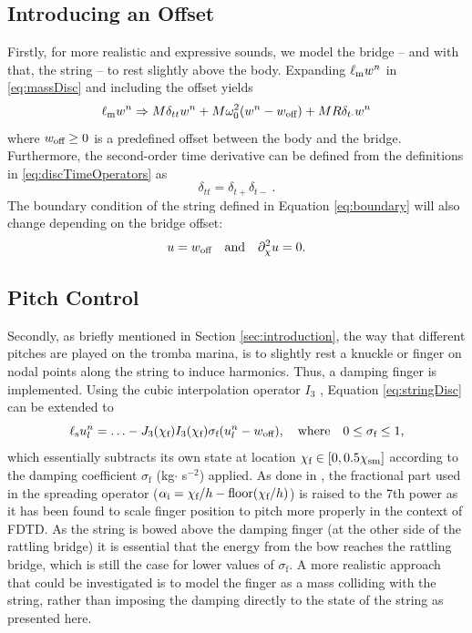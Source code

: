     \subsection{Introducing an Offset}
    Firstly, for more realistic and expressive sounds, we model the bridge -- and with that, the string -- to rest slightly above the body. Expanding $\ell_\text{m}w^n$ in \eqref{eq:massDisc} and including the offset yields
    \begin{equation}\label{eq:offset}
        \ell_\text{m}w^n \Rightarrow M\delta_{tt}w^n+M\omega_0^2(w^n-w_\text{off})+MR\delta_{t\cdot}w^n
    \end{equation}
    where $w_\text{off} \geq 0$ is a predefined offset between the body and the bridge. Furthermore, the second-order time derivative can be defined from the definitions in \eqref{eq:discTimeOperators} as
    \begin{equation}
        \delta_{tt} = \delta_{t+}\delta_{t-}\ .
    \end{equation}
    The boundary condition of the string defined in Equation \eqref{eq:boundary} will also change depending on the bridge offset:
    \begin{equation}\label{eq:newBoundary}
        u = w_\text{off}\quad \text{and} \quad \partial_\chi^2u=0.
    \end{equation}
    
    \subsection{Pitch Control}
    Secondly, as briefly mentioned in Section \ref{sec:introduction}, the way that different pitches are played on the tromba marina, is to slightly rest a knuckle or finger on nodal points along the string to induce harmonics. Thus, a damping finger is implemented. Using the cubic interpolation operator $I_3$ \cite{bilbao2009numerical}, Equation \eqref{eq:stringDisc} can be extended to
    \begin{equation}\label{eq:dampingFinger}
        \ell_\text{s} u_l^n = \hdots - J_3(\chi_\text{f})I_3(\chi_\text{f})\sigma_\text{f}(u^n_l-w_\text{off}),\quad \text{where} \quad 0\leq \sigma_\text{f} \leq 1,
    \end{equation}
    which essentially subtracts its own state at location $\chi_\text{f} \in [0,0.5\chi_\text{sm}]$ according to the damping coefficient $\sigma_\text{f}$ (kg$ \cdot$ s$^{-2}$) applied. As done in \cite{Willemsen2019a:SMC2020}, the fractional part used in the spreading operator ($\alpha_\text{i} = \chi_\text{f}/h - \text{floor}(\chi_\text{f}/h)$) is raised to the 7th power as it has been found to scale finger position to pitch more properly in the context of FDTD. As the string is bowed above the damping finger (at the other side of the rattling bridge) it is essential that the energy from the bow reaches the rattling bridge, which is still the case for lower values of $\sigma_\text{f}$. A more realistic approach that could be investigated is to model the finger as a mass colliding with the string, rather than imposing the damping directly to the state of the string as presented here.
    
